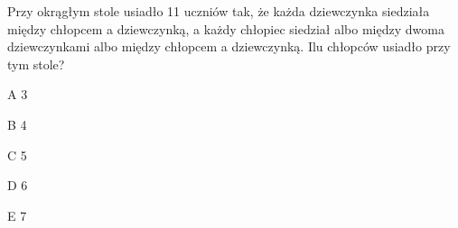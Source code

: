 \begin{tresc}
Przy okrągłym stole usiadło 11 uczniów tak, że każda dziewczynka siedziała między chłopcem a dziewczynką, a każdy chłopiec siedział albo między dwoma dziewczynkami albo między chłopcem a dziewczynką. Ilu chłopców usiadło przy tym stole?
\end{tresc}
\begin{wariant}{A} 3 \end{wariant}
\begin{wariant}{B} 4 \end{wariant}
\begin{wariant}{C} 5 \end{wariant}
\begin{wariant}{D} 6 \end{wariant}
\begin{wariant}{E} 7 \end{wariant}
